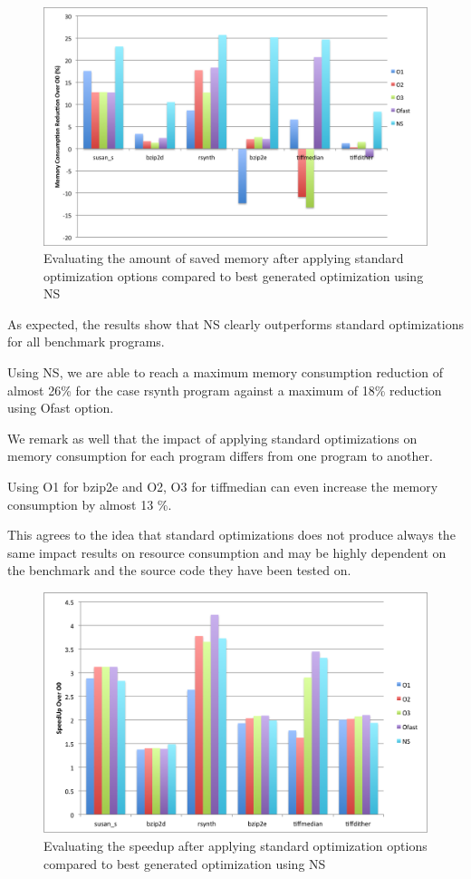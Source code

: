 \begin{figure}[!ht]
	\centering
	\includegraphics[width=1.\linewidth]{chapitre4/fig/infra_novelty_stat3.png}
	\caption{Evaluating the amount of saved memory after applying standard optimization options compared to best generated optimization using NS}
	\label{fig:infra_novelty_stat3.pdf}
\end{figure}


As expected, the results show that NS clearly outperforms standard optimizations for all benchmark programs. 

Using NS, we are able to reach a maximum memory consumption reduction of almost 26\% for the case rsynth program against a maximum of 18\% reduction using Ofast option.

We remark as well that the impact of applying standard optimizations on memory consumption for each program differs from one program to another. 

Using O1 for bzip2e and O2, O3 for tiffmedian can even increase the memory consumption by almost 13 \%. 

This agrees to the idea that standard optimizations does not produce always the same impact results on resource consumption and may be highly dependent on the benchmark and the source code they have been tested on. 

\begin{figure}[!ht]
	\centering
	\includegraphics[width=1.\linewidth]{chapitre4/fig/infra_novelty_stat2.png}
	\caption{Evaluating the speedup after applying standard optimization options compared to best generated optimization using NS}
	\label{fig:infra_novelty_stat2.pdf}
\end{figure}

